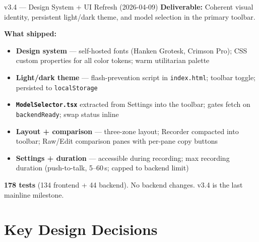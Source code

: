 \documentclass{beamer}
\begin{document}
\begin{frame}{v3.4 --- Design System + UI Refresh (2026-04-09)}
    \small
    \textbf{Deliverable:} Coherent visual identity, persistent light/dark theme,
    and model selection in the primary toolbar.

    \vspace{0.15em}
    \textbf{What shipped:}
    \begin{itemize}\setlength{\itemsep}{0pt}\footnotesize
        \item \textbf{Design system} --- self-hosted fonts (Hanken Grotesk, Crimson Pro);
              CSS custom properties for all color tokens; warm utilitarian palette
        \item \textbf{Light/dark theme} --- flash-prevention script in
              \texttt{index.html}; toolbar toggle; persisted to \texttt{localStorage}
        \item \textbf{\texttt{ModelSelector.tsx}} extracted from Settings into the
              toolbar; gates fetch on \texttt{backendReady}; swap status inline
        \item \textbf{Layout + comparison} --- three-zone layout; Recorder compacted
              into toolbar; Raw/Edit comparison panes with per-pane copy buttons
        \item \textbf{Settings + duration} --- accessible during recording; max
              recording duration (push-to-talk, 5--60\,s; capped to backend limit)
    \end{itemize}

    \vspace{0.1em}
    {\footnotesize\textbf{178 tests} (134 frontend + 44 backend).
    No backend changes. v3.4 is the last mainline milestone.}
\end{frame}


\section{Key Design Decisions}
\end{document}
